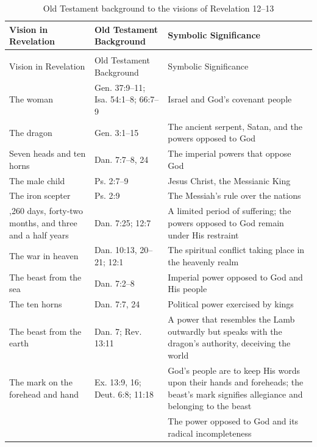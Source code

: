 {
\small
\renewcommand{\arraystretch}{1}
\setlength{\tabcolsep}{4pt}

\begin{longtable}{
  >{\raggedright\arraybackslash}p{}
  >{\raggedright\arraybackslash}p{}
  >{\raggedright\arraybackslash}p{}
}
\caption{Old Testament background to the visions of Revelation 12--13}
\label{tab:rev12-13-ot-background} \\
\hline
Vision in Revelation &
Old Testament Background &
Symbolic Significance\\
\hline
\endfirsthead

\multicolumn{3}{l}{\small\itshape Table~\thetable\ (continued)} \\
\hline
Vision in Revelation &
Old Testament Background &
Symbolic Significance\\
\hline
\endhead

\hline
\endfoot

\hline
\endlastfoot

The woman &
Gen. 37:9--11; Isa. 54:1--8; 66:7--9 &
Israel and God's covenant people \\

The dragon &
Gen. 3:1--15 &
The ancient serpent, Satan, and the powers opposed to God \\

Seven heads and ten horns &
Dan. 7:7--8, 24 &
The imperial powers that oppose God \\

The male child &
Ps. 2:7--9 &
Jesus Christ, the Messianic King \\

The iron scepter &
Ps. 2:9 &
The Messiah's rule over the nations \\

1,260 days, forty-two months, and three and a half years &
Dan. 7:25; 12:7 &
A limited period of suffering; the powers opposed to God remain under His restraint \\

The war in heaven &
Dan. 10:13, 20--21; 12:1 &
The spiritual conflict taking place in the heavenly realm \\

The beast from the sea &
Dan. 7:2--8 &
Imperial power opposed to God and His people \\

The ten horns &
Dan. 7:7, 24 &
Political power exercised by kings \\

The beast from the earth &
Dan. 7; Rev. 13:11 &
A power that resembles the Lamb outwardly but speaks with the dragon's authority, deceiving the world \\

The mark on the forehead and hand &
Ex. 13:9, 16; Deut. 6:8; 11:18 &
God's people are to keep His words upon their hands and foreheads; the beast's mark signifies allegiance and belonging to the beast \\

666 &
&
The power opposed to God and its radical incompleteness \\

\end{longtable}
}

